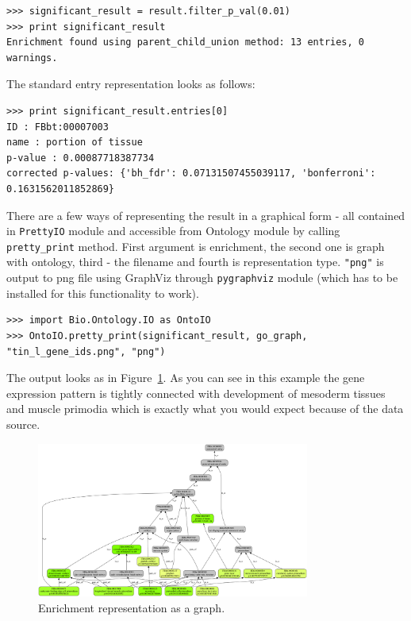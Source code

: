 \documentclass{report}
\begin{document}
\begin{verbatim}
>>> significant_result = result.filter_p_val(0.01)
>>> print significant_result
Enrichment found using parent_child_union method: 13 entries, 0 warnings.
\end{verbatim}


The standard entry representation looks as follows:

\begin{verbatim}
>>> print significant_result.entries[0]
ID : FBbt:00007003
name : portion of tissue
p-value : 0.00087718387734
corrected p-values: {'bh_fdr': 0.07131507455039117, 'bonferroni': 0.1631562011852869}
\end{verbatim}

There are a few ways of representing the result in a graphical form - all
contained in \verb|PrettyIO| module and accessible from Ontology module by
calling \verb|pretty_print| method. First argument is enrichment, the
second one is graph with ontology, third - the filename and fourth is
representation type. \verb|"png"| is output to png file using GraphViz through
\verb|pygraphviz| module (which has to be installed for this functionality to
work).

\begin{verbatim}
>>> import Bio.Ontology.IO as OntoIO
>>> OntoIO.pretty_print(significant_result, go_graph, "tin_l_gene_ids.png", "png")
\end{verbatim}

The output looks as in Figure~\ref{fig:graphoutput}. As you can see in this example
the gene expression pattern is tightly connected with development of 
mesoderm tissues and muscle primodia which is exactly what you would expect
because of the data source.

\begin{htmlonly}
\label{fig:graphoutput}
\end{htmlonly}

\begin{latexonly}
\begin{figure}[htbp]
\centering
\includegraphics[width=0.8\textwidth]{images/tin_l_gene_ids.png}
\caption{Enrichment representation as a graph.}
\label{fig:graphoutput}
\end{figure}
\end{latexonly}
\end{document}
